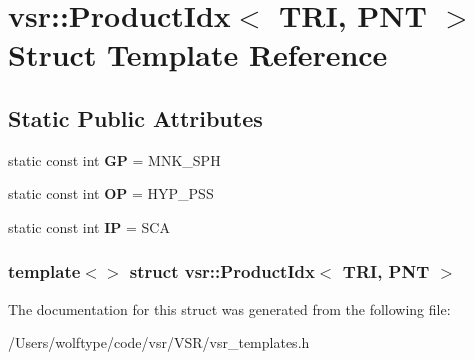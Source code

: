 \hypertarget{structvsr_1_1_product_idx_3_01_t_r_i_00_01_p_n_t_01_4}{\section{vsr\-:\-:Product\-Idx$<$ T\-R\-I, P\-N\-T $>$ Struct Template Reference}
\label{structvsr_1_1_product_idx_3_01_t_r_i_00_01_p_n_t_01_4}
}
\subsection*{Static Public Attributes}
\begin{DoxyCompactItemize}
\item 
\hypertarget{structvsr_1_1_product_idx_3_01_t_r_i_00_01_p_n_t_01_4_a03fd102fce13f992ae225c2b5d7fe30e}{static const int {\bfseries G\-P} = M\-N\-K\-\_\-\-S\-P\-H}\label{structvsr_1_1_product_idx_3_01_t_r_i_00_01_p_n_t_01_4_a03fd102fce13f992ae225c2b5d7fe30e}

\item 
\hypertarget{structvsr_1_1_product_idx_3_01_t_r_i_00_01_p_n_t_01_4_a7fb46ded9ef740c04c052c9b003a45f9}{static const int {\bfseries O\-P} = H\-Y\-P\-\_\-\-P\-S\-S}\label{structvsr_1_1_product_idx_3_01_t_r_i_00_01_p_n_t_01_4_a7fb46ded9ef740c04c052c9b003a45f9}

\item 
\hypertarget{structvsr_1_1_product_idx_3_01_t_r_i_00_01_p_n_t_01_4_adfb635e5c7fd4a1add438134cfaf25e3}{static const int {\bfseries I\-P} = S\-C\-A}\label{structvsr_1_1_product_idx_3_01_t_r_i_00_01_p_n_t_01_4_adfb635e5c7fd4a1add438134cfaf25e3}

\end{DoxyCompactItemize}
\subsubsection*{template$<$$>$ struct vsr\-::\-Product\-Idx$<$ T\-R\-I, P\-N\-T $>$}



The documentation for this struct was generated from the following file\-:\begin{DoxyCompactItemize}
\item 
/\-Users/wolftype/code/vsr/\-V\-S\-R/vsr\-\_\-templates.\-h\end{DoxyCompactItemize}
